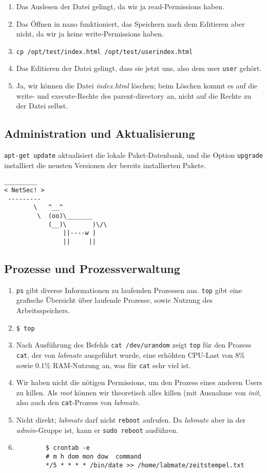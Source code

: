 \documentclass[12pt,a4paper]{article}
\begin{document}
\begin{enumerate}
    \item Das Auslesen der Datei gelingt, da wir ja read-Permissions haben.
    \item Das Öffnen in nano funktioniert, das Speichern nach dem Editieren aber nicht,
        da wir ja keine write-Permissions haben.
    \item \texttt{cp /opt/test/index.html /opt/test/userindex.html}
    \item Das Editieren der Datei gelingt, dass sie jetzt uns, also dem user \texttt{user}
        gehört.
    \item Ja, wir können die Datei \textit{index.html} löschen; beim Löschen kommt
        es auf die write- und execute-Rechte des parent-directory an, nicht auf die Rechte
        zu der Datei selbst.
\end{enumerate}
\subsection{Administration und Aktualisierung}
\texttt{apt-get update} aktualisiert die lokale Paket-Datenbank, und die Option
\texttt{upgrade} installiert die neusten Versionen der bereits installierten Pakete.
\\
\begin{verbatim}
_________ 
< NetSec! >
 --------- 
        \   ^__^
         \  (oo)\_______
            (__)\       )\/\
                ||----w |
                ||     ||
\end{verbatim}
\subsection{Prozesse und Prozessverwaltung}
\begin{enumerate}
    \item \texttt{ps} gibt diverse Informationen zu laufenden Prozessen aus. \texttt{top}
        gibt eine grafische Übersicht über laufende Prozesse, sowie Nutzung des
        Arbeitsspeichers.
    \item \texttt{\$ top} %
    \item Nach Ausführung des Befehls \texttt{cat /dev/urandom} zeigt \texttt{top} %
        für den Prozess \texttt{cat}, der von \textit{labmate} ausgeführt wurde, eine
        erhöhten CPU-Last von 8\% sowie 0.1\% RAM-Nutzung an, was für \texttt{cat} sehr
        viel ist.
    \item Wir haben nicht die nötigen Permissions, um den Prozess eines anderen Users zu
        killen. Als \textit{root} können wir theoretisch alles killen (mit Ausnahme
        von \textit{init}, also auch den \texttt{cat}-Prozess von \textit{labmate}.
    \item Nicht direkt; \textit{labmate} darf nicht \texttt{reboot} aufrufen. Da
        \textit{labmate} aber in der \textit{admin}-Gruppe ist, kann er
        \texttt{sudo reboot} ausführen.
    \item
        \begin{verbatim}
        $ crontab -e
        # m h dom mon dow  command
        */5 * * * * /bin/date >> /home/labmate/zeitstempel.txt
        \end{verbatim}
\end{enumerate}
\end{document}
